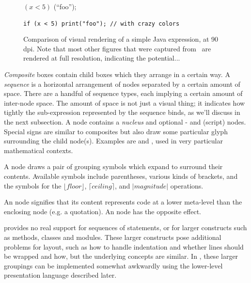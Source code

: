 \begin{figure}

 $(x < 5)$ (``\textsf{foo}'');

\texttt{if (x < 5) print("foo");  // with crazy colors}

\label{fig-syntax-coloring}
\caption{Comparison of visual rendering of a simple Java expression, at 90 dpi. Note that most other figures that were captured from \Meta\ are rendered at full resolution, indicating the potential...}
\end{figure}

\emph{Composite} boxes contain child boxes which they arrange in a certain way. A \emph{sequence} is a horizontal arrangement of nodes separated by a certain amount of space. There are a handful of sequence types, each implying a certain amount of inter-node space. The amount of space is not just a visual thing; it indicates how tightly the sub-expression represented by the sequence binds, as we'll discuss in the next subsection. A  node contains a \emph{nucleus} and optional - and (script) nodes. Special signs are similar to composites but also draw some particular glyph surrounding the child node(s). Examples are  and , used in very particular mathematical contexts.

A  node draws a pair of grouping symbols which expand to surround their contents. Available symbols include parentheses, various kinds of brackets, and the symbols for the $\lfloor\mathit{floor}\rfloor$, $\lceil\mathit{ceiling}\rceil$, and $|\mathit{magnitude}|$ operations.

An  node signifies that its content represents code at a lower meta-level than the enclosing node (e.g. a quotation). An  node has the opposite effect. 


 provides no real support for sequences of statements, or for larger constructs such as methods, classes and modules. These larger constructs pose additional problems for layout, such as how to handle indentation and whether lines should be wrapped and how, but the underlying concepts are similar. In \Meta, these larger groupings can be implemented somewhat awkwardly using the lower-level presentation language described later. 



